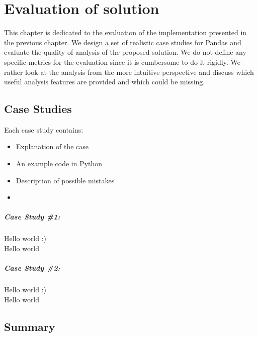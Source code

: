 \chapter{Evaluation of solution}

This chapter is dedicated to the evaluation of the implementation presented in the previous chapter.
We design a set of realistic case studies for Pandas and evaluate the quality of analysis of the proposed solution.
We do not define any specific metrics for the evaluation since it is cumbersome to do it rigidly.
We rather look at the analysis from the more intuitive perspective and discuss which useful analysis features are
provided and which could be missing.

\section{Case Studies}

Each case study contains:
\begin{itemize}
    \item Explanation of the case
    \item An example code in Python
    \item Description of possible mistakes
    \item
\end{itemize}

\paragraph{Case Study \#1:} Hello world :) \\
Hello world

\paragraph{Case Study \#2:} Hello world :) \\
Hello world



\section*{Summary}

